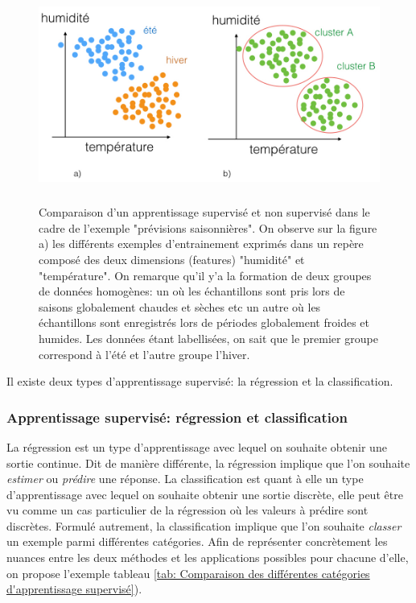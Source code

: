 \begin{figure}[h]
	\centering\includegraphics[height=7cm]{images/apprentissage_meteo.jpeg}
	\caption[Comparaison d'un apprentissage supervisé et non supervisé dans le cadre de l'exemple "prévisions saisonnières"]{Comparaison d'un apprentissage supervisé et non supervisé dans le cadre de l'exemple "prévisions saisonnières". On observe sur la figure a) les différents exemples d'entrainement exprimés dans un repère composé des deux dimensions (features) "humidité" et "température". On remarque qu'il y'a la formation de deux groupes de données homogènes: un où les échantillons sont pris lors de saisons globalement chaudes et sèches etc un autre où les échantillons sont enregistrés lors de périodes globalement froides et humides. Les données étant labellisées, on sait que le premier groupe correspond à l'été et l'autre groupe l'hiver.}
	\label{fig:Comparaison d'un apprentissage supervisé et non supervisé dans le cadre de l'exemple prévision saisonnières}
\end{figure}

Il existe deux types d'apprentissage supervisé: la régression et la classification.

\subsubsection{Apprentissage supervisé: régression et classification} 
\label{Le Machine Learning: Généralités sur le Machine Learning: Le modèle:Regression et classification}
 La régression est un type d'apprentissage avec lequel on souhaite obtenir une sortie continue. Dit de manière différente, la régression implique que l'on souhaite \emph{estimer} ou \emph{prédire} une réponse. La classification est quant à elle un type d'apprentissage avec lequel on souhaite obtenir une sortie discrète, elle peut être vu comme un cas particulier de la régression où les valeurs à prédire sont discrètes. Formulé autrement, la classification implique que l'on souhaite \emph{classer} un exemple parmi différentes catégories. Afin de représenter concrètement les nuances entre les deux méthodes et les applications possibles pour chacune d'elle, on propose l'exemple tableau \ref {tab: Comparaison des différentes catégories d'apprentissage supervisé}).


